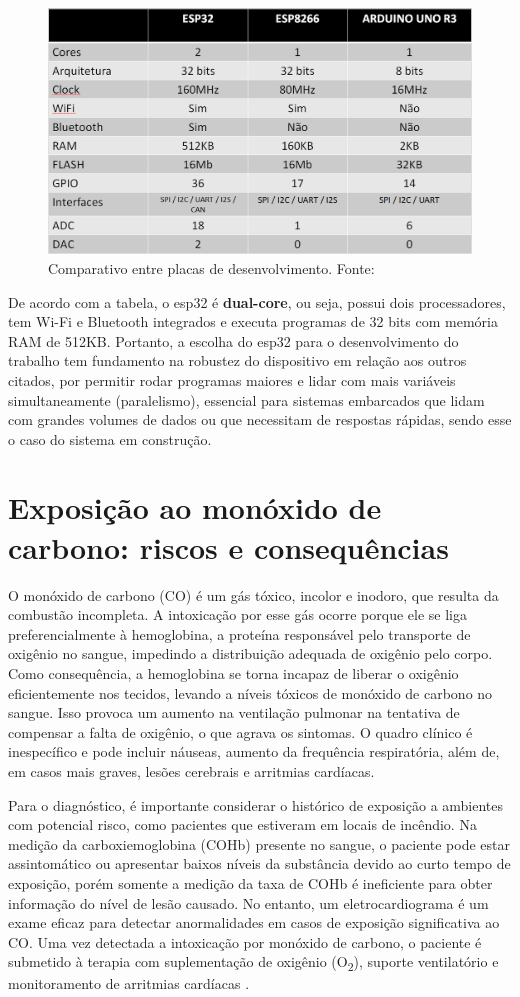 \begin{figure}[ht]
    \centering
    \includegraphics[width=.57\textwidth]{img/esp32-comparation-table.png}
    \caption{Comparativo entre placas de desenvolvimento. Fonte:\cite{esp32-comparation-table}}\label{figTableEsp}
\end{figure}

De acordo com a tabela, o esp32 é \textbf{dual-core}, ou seja, possui dois processadores, tem Wi-Fi e Bluetooth 
integrados e executa programas de 32 bits com memória RAM de 512KB. Portanto, a escolha do esp32 para o desenvolvimento 
do trabalho tem fundamento na robustez do dispositivo em relação aos outros citados, por permitir rodar programas maiores e lidar com mais variáveis simultaneamente (paralelismo), 
essencial para sistemas embarcados que lidam com grandes volumes de dados ou que necessitam de respostas rápidas, sendo esse o caso do sistema em construção. 

\section{Exposição ao monóxido de carbono: riscos e consequências}

O monóxido de carbono (CO) é um gás tóxico, incolor e inodoro, que resulta da combustão incompleta. A intoxicação por esse gás ocorre porque ele se liga preferencialmente à hemoglobina, a proteína 
responsável pelo transporte de oxigênio no sangue, impedindo a distribuição adequada de oxigênio pelo corpo. Como consequência, a hemoglobina se 
torna incapaz de liberar o oxigênio eficientemente nos tecidos, levando a níveis tóxicos de monóxido de carbono no sangue. Isso provoca um aumento na ventilação 
pulmonar na tentativa de compensar a falta de oxigênio, o que agrava os sintomas. O quadro clínico é inespecífico e pode incluir náuseas, aumento da 
frequência respiratória, além de, em casos mais graves, lesões cerebrais e arritmias cardíacas.

Para o diagnóstico, é importante considerar o histórico de exposição a ambientes com potencial risco, como pacientes que estiveram em locais de incêndio. Na medição 
da carboxiemoglobina (COHb) presente no sangue, o paciente pode estar assintomático ou apresentar baixos níveis da substância devido ao curto tempo de exposição, porém somente a medição da taxa de COHb é 
ineficiente para obter informação do nível de lesão causado. No entanto, um eletrocardiograma é um exame eficaz para detectar anormalidades em casos de exposição significativa ao CO. Uma vez detectada 
a intoxicação por monóxido de carbono, o paciente é submetido à terapia com suplementação de oxigênio (O\textsubscript{2}), suporte ventilatório e monitoramento de arritmias cardíacas \cite{carbon-monoxide-poisoning-varon}.

